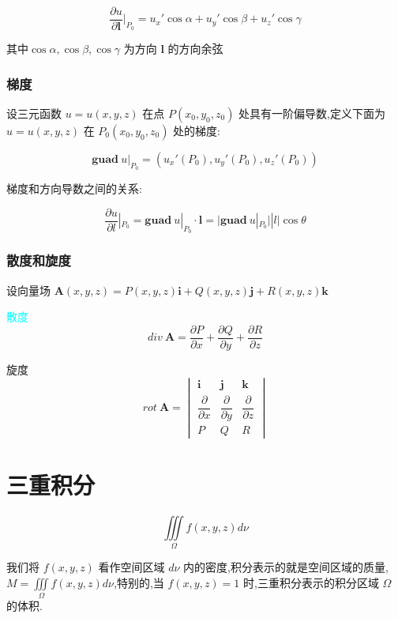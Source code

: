 \begin{theorem}[方向导数计算公式]
	$$\dfrac{\partial u}{\partial \boldsymbol{l}}|_{P_{0}}=u_{x}'\cos \alpha+u_{y}'\cos \beta+u_{z}'\cos \gamma$$
	
	其中$\cos \alpha,\cos \beta,\cos \gamma$ 为方向 $\boldsymbol{l}$ 的方向余弦
\end{theorem}

\subsection{梯度}

\begin{definition}[梯度]
	
	设三元函数 $u=u(x,y,z)$ 在点 $P(x_{0},y_{0},z_{0})$ 处具有一阶偏导数,定义下面为 $u=u(x,y,z)$ 在 $ P_{0}(x_{0},y_{0},z_{0})$ 处的梯度: 
	
	$$\boldsymbol{guad}\ u|_{P_{0}}=(u_{x}'(P_{0}),u_{y}'(P_{0}),u_{z}'(P_{0}))$$
	
	
	梯度和方向导数之间的关系: 

	$$\dfrac{\partial u}{\partial l}|_{P_{0}}=\boldsymbol{guad}\ u|_{P_{0}}\cdot \boldsymbol{l}=\big|\boldsymbol{guad}\ u|_{P_{0}}\big| |l|\cos \theta$$
\end{definition}

\subsection{散度和旋度}

\begin{definition}[散度和旋度]
	设向量场 $\boldsymbol{A}(x,y,z)=P(x,y,z)\boldsymbol{i} + Q(x,y,z)\boldsymbol{j} + R(x,y,z)\boldsymbol{k}$
	
	\textcolor{cyan}{散度} 
	$$div\ \boldsymbol{A}=\dfrac{\partial P}{\partial x}+\dfrac{\partial Q}{\partial y}+\dfrac{\partial R}{\partial z}$$
	
	\textcolor{purplea}{旋度}
	$$rot \ \boldsymbol{A} = 
	\begin{vmatrix}
		\boldsymbol{i} & \boldsymbol{j} & \boldsymbol{k}\\
		\dfrac{\partial}{\partial x} & \dfrac{\partial}{\partial y} & \dfrac{\partial}{\partial z} \\
		P & Q & R
	\end{vmatrix}$$
\end{definition}

\chapter{三重积分}
\begin{definition}[三重积分]
	$$\iiint\limits_{\Omega}f(x,y,z)d\nu$$
	
	我们将 $f(x,y,z)$ 看作空间区域 $d\nu$ 内的密度,积分表示的就是空间区域的质量,$M=\iiint\limits_{\Omega}f(x,y,z)d\nu$,特别的,当 $f(x,y,z)=1$ 时,三重积分表示的积分区域 $\Omega$ 的体积.
\end{definition}
